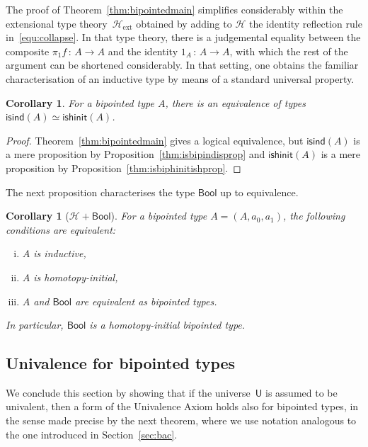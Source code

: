 \documentclass[10pt,a4paper,oneside,reqno]{amsart}
\numberwithin{equation}{section}
\theoremstyle{mythm}
\newtheorem{corollary}[theorem]{Corollary}
\theoremstyle{mydef}
\theoremstyle{myrmk}
\newcommand{\co}{\,{:}\,}
\newcommand{\Hint}{\mathcal{H}}
\newcommand{\Hext}{\mathcal{H}_{\mathrm{ext}}}
\newcommand{\isbipind}{\mathsf{isind}}
\newcommand{\isbiphinit}{\mathsf{ishinit}}
\newcommand{\Bool}{\mathsf{Bool}}
\newcommand{\U}{\mathsf{U}}
\begin{document}
The proof of Theorem~\ref{thm:bipointedmain} simplifies considerably within the extensional
type theory~$\Hext$ obtained by adding to $\Hint$ the identity reflection rule in~\eqref{equ:collapse}. In that type theory, 
there is a judgemental equality 
between the composite $\pi_1 f \co A \to A$ and the identity $1_A \co A \to A$, with which the
rest of the argument can be shortened considerably. In that setting, one obtains the familiar characterisation 
of an inductive type by means of a standard universal property.

\begin{corollary} For a bipointed type $A$, there is an equivalence of types $\isbipind(A)\simeq   \isbiphinit(A)$.
\end{corollary} 

\begin{proof} Theorem~\ref{thm:bipointedmain} gives a logical equivalence, but  $\isbipind(A)$ is a 
mere proposition by Proposition~\ref{thm:isbipindisprop} and $\isbiphinit(A)$ is a mere proposition
by Proposition~\ref{thm:isbiphinitishprop}. 
\end{proof}

The next proposition characterises the
type $\Bool$ up to equivalence.



\begin{corollary}[$\Hint + \Bool$]  For a bipointed type $A = (A, a_0, a_1)$, the following 
conditions are equivalent:
\begin{enumerate}[(i)]
\item $A$ is inductive,
\item $A$ is homotopy-initial,
\item $A$ and $\Bool$ are equivalent as bipointed types.
\end{enumerate}
In particular, $\Bool$ is a homotopy-initial bipointed type.
\end{corollary}





\subsection{Univalence for bipointed types} \label{sec:unibip}
We conclude this section by showing that if the universe~$\U$ is assumed to be univalent, then a form of the Univalence Axiom holds also for bipointed types, in the sense made precise by the next theorem, where we
use notation analogous to the one introduced in Section~\ref{sec:bac}. 
\end{document}
